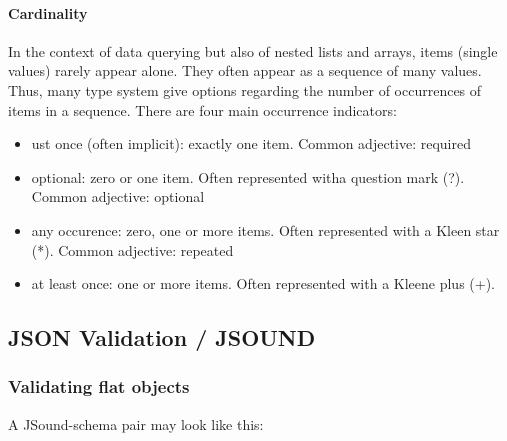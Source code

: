 \paragraph{Cardinality}
In the context of data querying but also of nested lists and arrays, items (single values) rarely appear alone. They often appear as a sequence of many values. Thus, many type system give options regarding the number of occurrences of items in a sequence. There are four main occurrence indicators:
\begin{itemize}
    \item ust once (often implicit): exactly one item. Common adjective: required
    \item optional: zero or one item. Often represented witha question mark (?). Common adjective: optional
    \item any occurence: zero, one or more items. Often represented with a Kleen star (*). Common adjective: repeated
    \item at least once: one or more items. Often represented with a Kleene plus (+).
\end{itemize}

\subsection{JSON Validation / JSOUND}

\subsubsection{Validating flat objects}
A JSound-schema pair may look like this:

